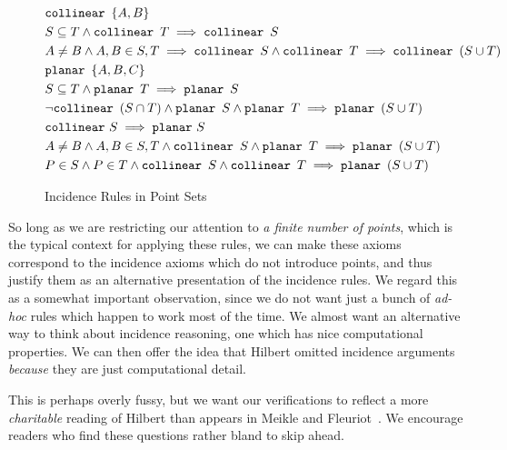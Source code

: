 \begin{figure}
\begin{align}
&\texttt{collinear}\ \, \{A,B\} \label{rule:colltwo}\\
&S \subseteq T \wedge \texttt{collinear}\ \, T \implies \texttt{collinear}\ \, S
  \label{rule:collsubset}\\
&A \neq B \wedge A,B \in S,T \implies \texttt{collinear}\ \, S \wedge \texttt{collinear}\ \, T \implies \texttt{collinear}\ \, (S \cup T) \label{rule:collunion}\\
&\texttt{planar}\ \, \{A,B,C\} \label{rule:planethree}\\
&S \subseteq T \wedge \texttt{planar}\ \, T \implies \texttt{planar}\ \, S
  \label{rule:planesubset}\\
&\neg\texttt{collinear}\ \, (S \cap T) \wedge \texttt{planar}\ \, S \wedge \texttt{planar}\ \, T \implies \texttt{planar}\ \, (S \cup T) \label{rule:planeunion}\\
&\texttt{collinear}\  S \implies \texttt{planar}\  S \label{rule:collplane}\\
&A \neq B \wedge A,B \in S,T \wedge \texttt{collinear}\ \, S \wedge \texttt{planar}\ \, T \implies \texttt{planar}\ \, (S \cup T) \label{rule:collplaneplane}\\
&P \in S \wedge P \in T \wedge \texttt{collinear}\ \, S \wedge \texttt{collinear}\ \, T \implies \texttt{planar}\ \, (S \cup T) \label{rule:collcollplane}
\end{align}
\caption{Incidence Rules in Point Sets}\label{fig:PointSets}
\end{figure}

So long as we are restricting our attention to \emph{a finite number of points}, which is the typical context for applying these rules, we can make these axioms correspond to the incidence axioms which do not introduce points, and thus justify them as an alternative presentation of the incidence rules. We regard this as a somewhat important observation, since we do not want just a bunch of \emph{ad-hoc} rules which happen to work most of the time. We almost want an alternative way to think about incidence reasoning, one which has nice computational properties. We can then offer the idea that Hilbert omitted incidence arguments \emph{because} they are just computational detail.

This is perhaps overly fussy, but we want our verifications to reflect a more \emph{charitable} reading of Hilbert than appears in Meikle and Fleuriot~\cite{MeikleFleuriotFormalizingHilbert}. We encourage readers who find these questions rather bland to skip ahead.

